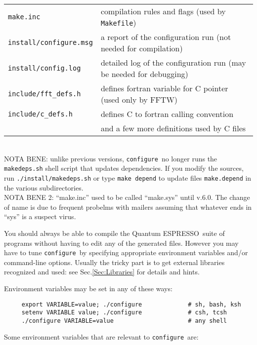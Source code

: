 \documentclass[12pt,a4paper]{article}
\def\qe{{\sc Quantum ESPRESSO}}
\def\configure{\texttt{configure}}
\begin{document}
\begin{tabular}{ll}
\texttt{make.inc} &      compilation rules and flags (used by \texttt{Makefile})\\
\texttt{install/configure.msg} & a report of the configuration run (not needed for compilation)\\
\texttt{install/config.log} & detailed log of the configuration run (may be needed for debugging)\\
\texttt{include/fft\_defs.h} &    defines fortran variable for C pointer (used only by FFTW)\\
\texttt{include/c\_defs.h} &      defines C to fortran calling convention\\
                           & and a few more definitions used by C files\\
\end{tabular}\\
NOTA BENE: unlike previous versions, \configure\ no longer runs the
\texttt{makedeps.sh} shell script that updates dependencies. If you modify the
sources, run \texttt{./install/makedeps.sh} or type \texttt{make depend}
to update files \texttt{make.depend} in the various subdirectories.\\
NOTA BENE 2: ``make.inc'' used to be called ``make.sys'' until v.6.0. The
change of name is due to frequent probelms with mailers assuming that
whatever ends in ``sys'' is a suspect virus.

You should always be able to compile the \qe\ suite
of programs without having to edit any of the generated files. However you
may have to tune \configure\ by specifying appropriate environment variables
and/or command-line options. Usually the tricky part is to get external
libraries recognized and used: see Sec.\ref{Sec:Libraries}
for details and hints.

Environment variables may be set in any of these ways:
\begin{verbatim}
     export VARIABLE=value; ./configure             # sh, bash, ksh
     setenv VARIABLE value; ./configure             # csh, tcsh
     ./configure VARIABLE=value                     # any shell
\end{verbatim}
Some environment variables that are relevant to \configure\ are:
\end{document}
